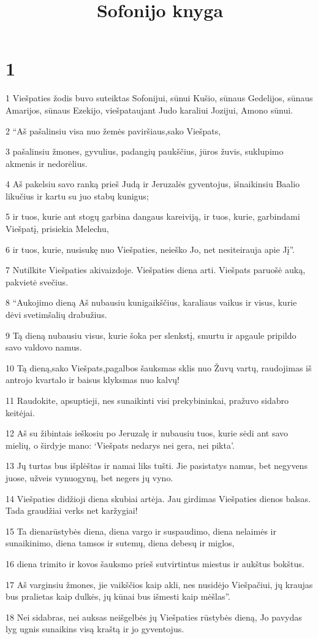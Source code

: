 

\title{Sofonijo knyga}

\chapter{1}


\par 1 Viešpaties žodis buvo suteiktas Sofonijui, sūnui Kušio, sūnaus Gedelijos, sūnaus Amarijos, sūnaus Ezekijo, viešpataujant Judo karaliui Jozijui, Amono sūnui. 
\par 2 “Aš pašalinsiu visa nuo žemės paviršiaus,­sako Viešpats,­ 
\par 3 pašalinsiu žmones, gyvulius, padangių paukščius, jūros žuvis, suklupimo akmenis ir nedorėlius. 
\par 4 Aš pakelsiu savo ranką prieš Judą ir Jeruzalės gyventojus, išnaikinsiu Baalio likučius ir kartu su juo stabų kunigus; 
\par 5 ir tuos, kurie ant stogų garbina dangaus kareiviją, ir tuos, kurie, garbindami Viešpatį, prisiekia Melechu, 
\par 6 ir tuos, kurie, nusisukę nuo Viešpaties, neieško Jo, net nesiteirauja apie Jį”. 
\par 7 Nutilkite Viešpaties akivaizdoje. Viešpaties diena arti. Viešpats paruošė auką, pakvietė svečius. 
\par 8 “Aukojimo dieną Aš nubausiu kunigaikščius, karaliaus vaikus ir visus, kurie dėvi svetimšalių drabužius. 
\par 9 Tą dieną nubausiu visus, kurie šoka per slenkstį, smurtu ir apgaule pripildo savo valdovo namus. 
\par 10 Tą dieną,­sako Viešpats,­pagalbos šauksmas sklis nuo Žuvų vartų, raudojimas iš antrojo kvartalo ir baisus klyksmas nuo kalvų! 
\par 11 Raudokite, apsuptieji, nes sunaikinti visi prekybininkai, pražuvo sidabro keitėjai. 
\par 12 Aš su žibintais ieškosiu po Jeruzalę ir nubausiu tuos, kurie sėdi ant savo mielių, o širdyje mano: ‘Viešpats nedarys nei gera, nei pikta’. 
\par 13 Jų turtas bus išplėštas ir namai liks tušti. Jie pasistatys namus, bet negyvens juose, užveis vynuogynų, bet negers jų vyno. 
\par 14 Viešpaties didžioji diena skubiai artėja. Jau girdimas Viešpaties dienos balsas. Tada graudžiai verks net karžygiai! 
\par 15 Ta diena­rūstybės diena, diena vargo ir suspaudimo, diena nelaimės ir sunaikinimo, diena tamsos ir sutemų, diena debesų ir miglos, 
\par 16 diena trimito ir kovos šauksmo prieš sutvirtintus miestus ir aukštus bokštus. 
\par 17 Aš varginsiu žmones, jie vaikščios kaip akli, nes nusidėjo Viešpačiui, jų kraujas bus pralietas kaip dulkės, jų kūnai bus išmesti kaip mėšlas”. 
\par 18 Nei sidabras, nei auksas neišgelbės jų Viešpaties rūstybės dieną, Jo pavydas lyg ugnis sunaikins visą kraštą ir jo gyventojus.


